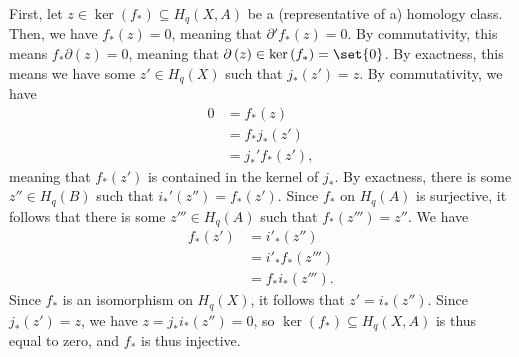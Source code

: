 \documentclass[10pt]{mypackage}
\begin{document}
\begin{solution}
\begin{enumerate}[(a)]
      First, let $z\in \ker\left( f_{\ast} \right)\subseteq H_q\left( X,A \right)$ be a (representative of a) homology class. Then, we have $f_{\ast}\left( z \right) = 0$, meaning that $\partial'f_{\ast}\left( z \right) = 0$. By commutativity, this means $f_{\ast}\partial \left( z \right) = 0$, meaning that $\partial\left( z \right)\in \ker\left( f_{\ast} \right) = \set{0}$. By exactness, this means we have some $z'\in H_q\left( X \right)$ such that $j_{\ast}\left( z' \right) = z$. By commutativity, we have
      \begin{align*}
        0 &= f_{\ast}\left( z \right)\\
          &= f_{\ast}j_{\ast}\left( z' \right)\\
          &= j_{\ast}'f_{\ast}\left( z' \right),
      \end{align*}
      meaning that $f_{\ast}\left( z' \right)$ is contained in the kernel of $j_{\ast}$. By exactness, there is some $z''\in H_q\left( B \right)$ such that $i_{\ast}'\left( z'' \right) = f_{\ast}\left( z' \right)$. Since $f_{\ast}$ on $H_{q}\left( A \right)$ is surjective, it follows that there is some $z'''\in H_q\left( A \right)$ such that $f_{\ast}\left( z''' \right) = z''$. We have
      \begin{align*}
        f_{\ast}\left( z' \right) &= i'_{\ast}\left( z'' \right)\\
                                  &= i'_{\ast}f_{\ast}\left( z''' \right)\\
                                  &= f_{\ast}i_{\ast}\left( z''' \right).
      \end{align*}
      Since $f_{\ast}$ is an isomorphism on $H_q\left( X \right)$, it follows that $z' = i_{\ast}\left( z'' \right)$. Since $j_{\ast}\left( z' \right) = z$, we have $z = j_{\ast}i_{\ast}\left( z'' \right) = 0$, so $\ker\left( f_{\ast} \right)\subseteq H_q\left( X,A \right)$ is thus equal to zero, and $f_{\ast}$ is thus injective.


\end{enumerate}
\end{solution}
\end{document}
